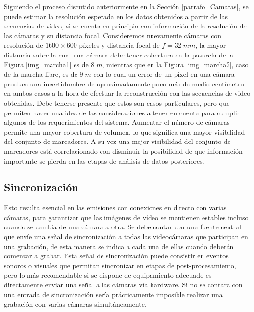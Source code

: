 Siguiendo el proceso discutido anteriormente en la Sección \ref{parrafo_Camaras}, se puede estimar la resolución esperada en los datos obtenidos a partir de las secuencias de video, si se cuenta en principio con información de la resolución de las cámaras y su distancia focal. Consideremos nuevamente cámaras con resolución de $1600\times600$ píxeles y distancia focal de $f=32\;mm$, la mayor distancia sobre la cual una cámara debe tener cobertura en la pasarela de la Figura \ref{img_marcha1} es de $8 \;m$, mientras que en la Figura  \ref{img_marcha2}, caso de la marcha libre, es de $9\;m$ con lo cual un error de un píxel en una cámara produce una incertidumbre de aproximadamente poco más de medio centímetro en ambos casos a la hora de efectuar la reconstrucción con las secuencias de video obtenidas. 
Debe tenerse presente que estos son casos particulares, pero que permiten hacer una idea de las consideraciones a tener en cuenta para cumplir algunos de los requerimientos del sistema. 
Aumentar el número de cámaras permite una mayor cobertura de volumen, lo que significa una mayor visibilidad del conjunto de marcadores. A su vez una mejor visibilidad del conjunto de marcadores está correlacionado con disminuir la posibilidad de que información importante se pierda en las etapas de análisis de datos posteriores.


\subsection{Sincronización} 

Esto resulta esencial en las emisiones con conexiones en directo con varias cámaras, para garantizar que las imágenes de vídeo se mantienen estables incluso cuando se cambia de una cámara a otra.
Se debe contar con una fuente central que envíe una señal de sincronización a todas las videocámaras que participan en una grabación, de esta manera se indica a cada una de ellas cuando deberán comenzar a grabar. 
Esta señal de sincronización puede consistir en eventos sonoros o visuales que permitan sincronizar en etapas de post-procesamiento, pero lo más recomendable si se dispone de equipamiento adecuado es directamente enviar una señal a las cámaras vía hardware.
Si no se contara con una entrada de sincronización sería prácticamente imposible realizar una grabación con varias cámaras simultáneamente.




